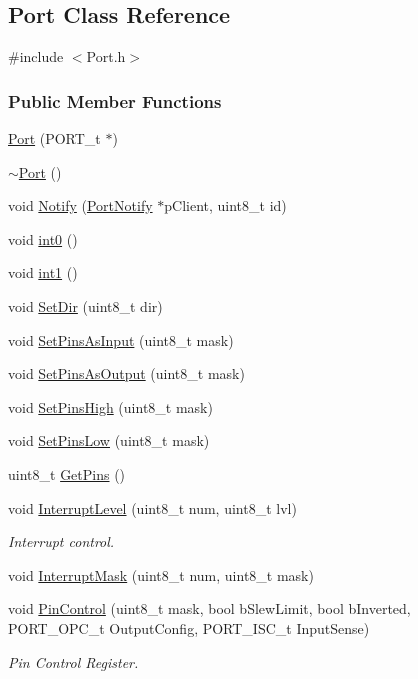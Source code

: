 \hypertarget{class_port}{
\subsection{Port Class Reference}
\label{class_port}
}


{\ttfamily \#include $<$Port.h$>$}

\subsubsection*{Public Member Functions}
\begin{DoxyCompactItemize}
\item 
\hyperlink{class_port_a6f90240a1d5bb00b7cb0284134ba3dfc}{Port} (PORT\_\-t $\ast$)
\item 
\hyperlink{class_port_afe166c2a6b10ad34d47472a150366bc1}{$\sim$Port} ()
\item 
void \hyperlink{class_port_a8dd6215565362d65fd4ef159b7b8dc95}{Notify} (\hyperlink{class_port_notify}{PortNotify} $\ast$pClient, uint8\_\-t id)
\item 
void \hyperlink{class_port_ab9841b306c73a2b7a1a7a141da222808}{int0} ()
\item 
void \hyperlink{class_port_ac1ea39cc9b07779045dd218aa2364e25}{int1} ()
\item 
void \hyperlink{class_port_a3c3182388b13059550d19e828959ab37}{SetDir} (uint8\_\-t dir)
\item 
void \hyperlink{class_port_a8edf3efbf5258faa7221109f5cbd5a40}{SetPinsAsInput} (uint8\_\-t mask)
\item 
void \hyperlink{class_port_a15035cc63128ae28294c154527c9d2fe}{SetPinsAsOutput} (uint8\_\-t mask)
\item 
void \hyperlink{class_port_a4c7069d8f3c95c2edbbb5945041c687d}{SetPinsHigh} (uint8\_\-t mask)
\item 
void \hyperlink{class_port_aa0e48b7851cc1352c5e8ddc371351e21}{SetPinsLow} (uint8\_\-t mask)
\item 
uint8\_\-t \hyperlink{class_port_ab13ab1f58e8f17fec681e38872ac56d9}{GetPins} ()
\item 
void \hyperlink{class_port_ae43736d7fff93b93d1d1dac27df64591}{InterruptLevel} (uint8\_\-t num, uint8\_\-t lvl)
\begin{DoxyCompactList}\small\item\em Interrupt control. \item\end{DoxyCompactList}\item 
void \hyperlink{class_port_a638be122540b191c8cb84b61d6363d28}{InterruptMask} (uint8\_\-t num, uint8\_\-t mask)
\item 
void \hyperlink{class_port_ab2f2ecab7c1402a03c87d866a8cd5380}{PinControl} (uint8\_\-t mask, bool bSlewLimit, bool bInverted, PORT\_\-OPC\_\-t OutputConfig, PORT\_\-ISC\_\-t InputSense)
\begin{DoxyCompactList}\small\item\em Pin Control Register. \item\end{DoxyCompactList}\end{DoxyCompactItemize}
